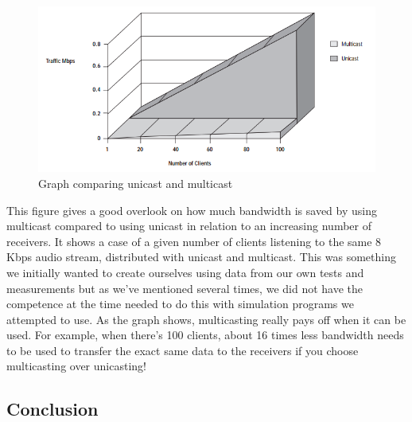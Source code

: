 \documentclass[9pt,a4paper]{acmproc}
\begin{document}
\begin{figure}[h!]
\includegraphics[width=\linewidth]{graph.png}
\caption{Graph comparing unicast and multicast}
\label{fig:graph}
\end{figure}

This figure gives a good overlook on how much bandwidth is saved by using multicast compared to using unicast in relation to an increasing number of receivers. It shows a case of a given number of clients listening to the same 8 Kbps audio stream, distributed with unicast and multicast. This was something we initially wanted to create ourselves using data from our own tests and measurements but as we’ve mentioned several times, we did not have the competence at the time needed to do this with simulation programs we attempted to use. As the graph shows, multicasting really pays off when it can be used. For example, when there's 100 clients, about 16 times less bandwidth needs to be used to transfer the exact same data to the receivers if you choose multicasting over unicasting! \cite[s.~4]{graphSource}

\subsection{Conclusion}
\end{document}
